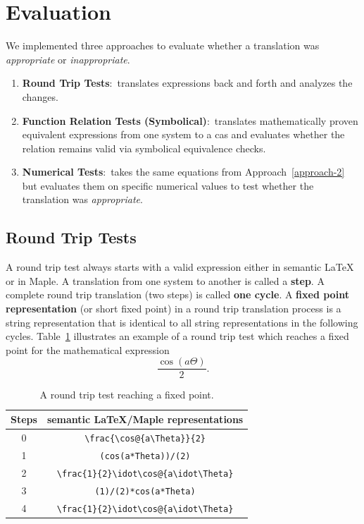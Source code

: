 \documentclass[a4paper,11pt]{article}
\newcommand{\Maple}{Maple}
\theoremstyle{defTheoStyle}
\theoremstyle{defExampStyle}
\begin{document}
	\section{Evaluation}\label{sec:evaluation}
	We implemented three approaches to evaluate whether a translation was \textit{appropriate} or \textit{inappropriate}.
	\begin{enumerate}
		\item \textbf{Round Trip Tests}:~translates expressions back and forth and analyzes the changes.
		\item\label{approach-2} \textbf{Function Relation Tests (Symbolical)}:~translates mathematically proven equivalent expressions from one system to a \gls*{cas} and evaluates whether the relation remains valid via symbolical equivalence checks.
		\item \textbf{Numerical Tests}:~takes the same equations from Approach~\ref{approach-2} but evaluates them on specific numerical values to test whether the translation was {\it appropriate}.
	\end{enumerate}
	
	\subsection{Round Trip Tests}\label{sec:round-trip}
	A round trip test always starts with a valid expression either in semantic \LaTeX{} or in \Maple. A translation from one system to another is called a \textbf{step}. A complete round trip translation (two steps) is called \textbf{one cycle}. A \textbf{fixed point representation} (or short fixed point) in a round trip translation process is a string representation that is identical to all string representations in the following cycles. Table~\ref{tab:fixpoint} illustrates an example of a round trip test which reaches a fixed point for the mathematical expression
	\begin{equation}
	\frac{\cos\left(a\Theta\right)}{2}.
	\end{equation}
	
	\begin{table}[ht]
		\centering
		\begin{tabular}{cc}
			\hline 
			Steps & semantic \LaTeX{}/\Maple{} representations\\
			\hline
			\rule{0pt}{0.9\normalbaselineskip}0 & \verb|\frac{\cos@{a\Theta}}{2}|\\
			1 & \verb|(cos(a*Theta))/(2)| \\
			2 & \verb|\frac{1}{2}\idot\cos@{a\idot\Theta}| \\
			3 & \verb|(1)/(2)*cos(a*Theta)|\\
			4 & \verb|\frac{1}{2}\idot\cos@{a\idot\Theta}| \\
			\hline
		\end{tabular}
		\caption{A round trip test reaching a fixed point.}
		\label{tab:fixpoint}
	\end{table}
	
\end{document}

